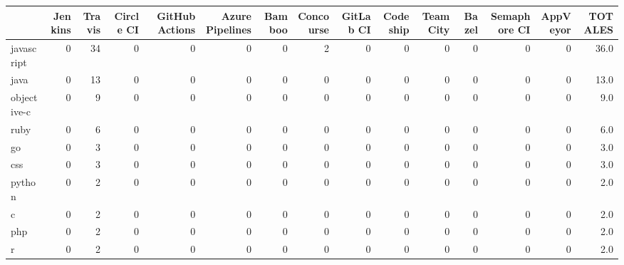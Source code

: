 \begin{tabular}{lrrrrrrrrrrrrrr}
\toprule
{} &  Jenkins &  Travis &  Circle CI &  GitHub Actions &  Azure Pipelines &  Bamboo &  Concourse &  GitLab CI &  Codeship &  TeamCity &  Bazel &  Semaphore CI &  AppVeyor &  TOTALES \\
\midrule
javascript   &        0 &      34 &          0 &               0 &                0 &       0 &          2 &          0 &         0 &         0 &      0 &             0 &         0 &     36.0 \\
java         &        0 &      13 &          0 &               0 &                0 &       0 &          0 &          0 &         0 &         0 &      0 &             0 &         0 &     13.0 \\
objective-c  &        0 &       9 &          0 &               0 &                0 &       0 &          0 &          0 &         0 &         0 &      0 &             0 &         0 &      9.0 \\
ruby         &        0 &       6 &          0 &               0 &                0 &       0 &          0 &          0 &         0 &         0 &      0 &             0 &         0 &      6.0 \\
go           &        0 &       3 &          0 &               0 &                0 &       0 &          0 &          0 &         0 &         0 &      0 &             0 &         0 &      3.0 \\
css          &        0 &       3 &          0 &               0 &                0 &       0 &          0 &          0 &         0 &         0 &      0 &             0 &         0 &      3.0 \\
python       &        0 &       2 &          0 &               0 &                0 &       0 &          0 &          0 &         0 &         0 &      0 &             0 &         0 &      2.0 \\
c            &        0 &       2 &          0 &               0 &                0 &       0 &          0 &          0 &         0 &         0 &      0 &             0 &         0 &      2.0 \\
php          &        0 &       2 &          0 &               0 &                0 &       0 &          0 &          0 &         0 &         0 &      0 &             0 &         0 &      2.0 \\
r            &        0 &       2 &          0 &               0 &                0 &       0 &          0 &          0 &         0 &         0 &      0 &             0 &         0 &      2.0 \\

\end{tabular}
